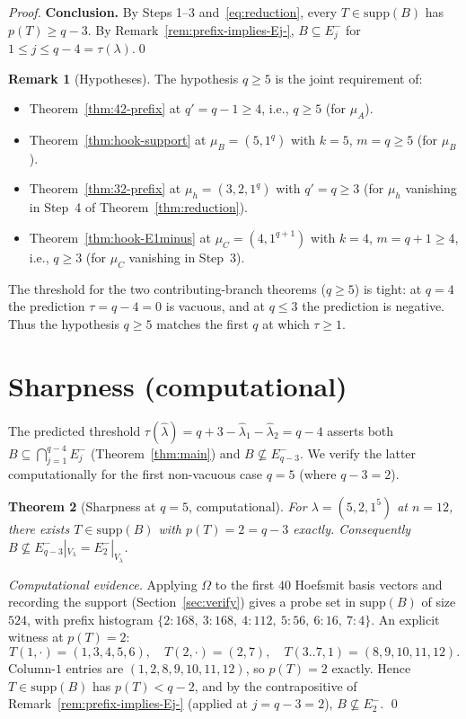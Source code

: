 \documentclass[11pt]{article}
\newtheorem{theorem}{Theorem}
\theoremstyle{definition}
\newtheorem{remark}[theorem]{Remark}
\newcommand{\Om}{\Omega}
\newcommand{\hatl}{\widehat\lambda}
\newcommand{\supp}{\mathrm{supp}}
\begin{document}
\begin{proof}
\medskip\textbf{Conclusion.}  By Steps 1--3 and~\eqref{eq:reduction},
every $T \in \supp(B)$ has $p(T) \ge q - 3$.  By
Remark~\ref{rem:prefix-implies-Ej-}, $B \subseteq E_j^-$ for $1 \le
j \le q - 4 = \tau(\lambda)$.\qed
\end{proof}

\begin{remark}[Hypotheses]\label{rem:hyp}
The hypothesis $q \ge 5$ is the joint requirement of:
\begin{itemize}[topsep=0.2em,itemsep=0.1em]
\item Theorem~\ref{thm:42-prefix} at $q' = q - 1 \ge 4$, i.e., $q \ge 5$
   (for $\mu_A$).
\item Theorem~\ref{thm:hook-support} at $\mu_B = (5, 1^q)$ with
   $k = 5$, $m = q \ge 5$ (for $\mu_B$).
\item Theorem~\ref{thm:32-prefix} at $\mu_h = (3, 2, 1^{q})$ with
   $q' = q \ge 3$ (for $\mu_h$ vanishing in Step~4 of
   Theorem~\ref{thm:reduction}).
\item Theorem~\ref{thm:hook-E1minus} at $\mu_C = (4, 1^{q+1})$ with
   $k = 4$, $m = q + 1 \ge 4$, i.e., $q \ge 3$ (for $\mu_C$ vanishing
   in Step~3).
\end{itemize}
The threshold for the two contributing-branch theorems ($q \ge 5$) is
tight: at $q = 4$ the prediction $\tau = q - 4 = 0$ is vacuous, and at
$q \le 3$ the prediction is negative.  Thus the hypothesis $q \ge 5$
matches the first $q$ at which $\tau \ge 1$.
\end{remark}

\section{Sharpness (computational)}\label{sec:sharp}

The predicted threshold $\tau(\hatl) = q + 3 - \hatl_1 - \hatl_2 =
q - 4$ asserts both
$B \subseteq \bigcap_{j=1}^{q-4} E_j^-$ (Theorem~\ref{thm:main}) and
$B \not\subseteq E_{q-3}^-$.  We verify the latter computationally
for the first non-vacuous case $q = 5$ (where $q - 3 = 2$).

\begin{theorem}[Sharpness at $q = 5$, computational]\label{thm:sharp-q5}
For $\lambda = (5, 2, 1^5)$ at $n = 12$, there exists $T \in \supp(B)$
with $p(T) = 2 = q - 3$ exactly.  Consequently $B \not\subseteq
E_{q-3}^-|_{V_\lambda} = E_2^-|_{V_\lambda}$.
\end{theorem}

\begin{proof}[Computational evidence]
Applying $\Om$ to the first $40$ Hoefsmit basis vectors and recording
the support (Section~\ref{sec:verify}) gives a probe set in $\supp(B)$
of size $524$, with prefix histogram
$\{2: 168,\ 3: 168,\ 4: 112,\ 5: 56,\ 6: 16,\ 7: 4\}$.  An explicit
witness at $p(T) = 2$:
\[
   T(1, \cdot) = (1, 3, 4, 5, 6),
   \quad T(2, \cdot) = (2, 7),
   \quad T(3..7, 1) = (8, 9, 10, 11, 12).
\]
Column-$1$ entries are $(1, 2, 8, 9, 10, 11, 12)$, so $p(T) = 2$
exactly.  Hence $T \in \supp(B)$ has $p(T) < q - 2$, and by the
contrapositive of Remark~\ref{rem:prefix-implies-Ej-} (applied at
$j = q - 3 = 2$), $B \not\subseteq E_2^-$.
\qed
\end{proof}
\end{document}

